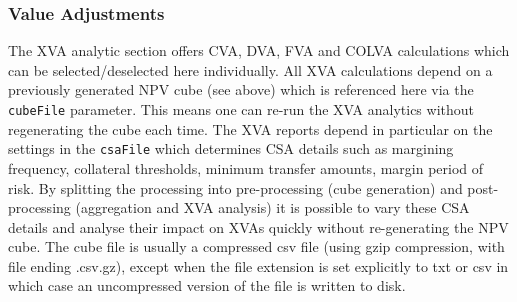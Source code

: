 {\subsubsection{Value Adjustments}

The XVA analytic section offers CVA, DVA, FVA and COLVA calculations which can be selected/deselected here
individually. All XVA calculations depend on a previously generated NPV cube (see above) which is referenced here via
the {\tt cubeFile} parameter. This means one can re-run the XVA analytics without regenerating the cube each time. The
XVA reports depend in particular on the settings in the {\tt csaFile} which determines CSA details such as margining
frequency, collateral thresholds, minimum transfer amounts, margin period of risk. By splitting the processing into
pre-processing (cube generation) and post-processing (aggregation and XVA analysis) it is possible to vary these CSA
details and analyse their impact on XVAs quickly without re-generating the NPV cube. The cube file is usually a
compressed csv file (using gzip compression, with file ending .csv.gz), except when the file extension is set explicitly
to txt or csv in which case an uncompressed version of the file is written to disk.

}
